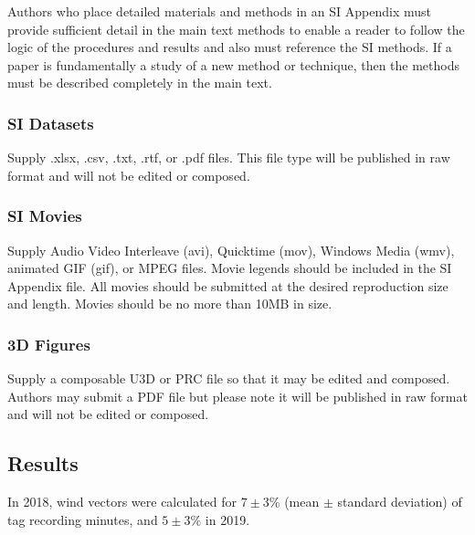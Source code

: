 \documentclass[9pt,twocolumn,twoside,lineno]{pnas-new}
\begin{document}
Authors who place detailed materials and methods in an SI Appendix must provide sufficient detail in the main text methods to enable a reader to follow the logic of the procedures and results and also must reference the SI methods. If a paper is fundamentally a study of a new method or technique, then the methods must be described completely in the main text.

\subsubsection*{SI Datasets} 

Supply .xlsx, .csv, .txt, .rtf, or .pdf files. This file type will be published in raw format and will not be edited or composed.


\subsubsection*{SI Movies}

Supply Audio Video Interleave (avi), Quicktime (mov), Windows Media (wmv), animated GIF (gif), or MPEG files. Movie legends should be included in the SI Appendix file. All movies should be submitted at the desired reproduction size and length. Movies should be no more than 10MB in size.


\subsubsection*{3D Figures}

Supply a composable U3D or PRC file so that it may be edited and composed. Authors may submit a PDF file but please note it will be published in raw format and will not be edited or composed.

\subsection{Results}

In 2018, wind vectors were calculated for $7 \pm 3\%$ (mean $\pm$ standard deviation) of tag recording minutes, and $5 \pm 3\%$ in 2019.
\end{document}
